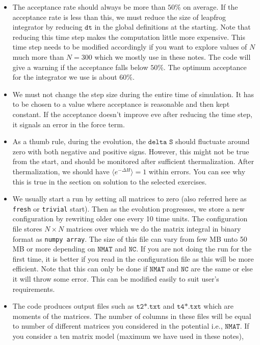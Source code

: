 \documentclass[11pt]{article}
\begin{document}
\begin{itemize} 
\item The acceptance rate should always be more than $50\%$
on average. If the acceptance rate is less than this, we
must reduce the size of leapfrog integrator by reducing 
$\texttt{dt}$ in the global definitions at the starting. Note that 
reducing this time step makes the computation little more expensive. 
This time step needs to be modified accordingly if you want to explore values of $N$
much more than $N = 300$ which we mostly use in these notes. The code will give a warning
if the acceptance falls below $50\%$. The optimum acceptance for the integrator we use is 
about $60\%$. 
\item We must not change the step size during the entire time of simulation. It has to be 
chosen to a value where acceptance is reasonable and then kept constant. If the acceptance
doesn't improve eve after reducing the time step, it signals an error in the force term.
\item As a thumb rule, during the evolution, the $\texttt{delta S}$ should fluctuate around zero
with both negative and positive signs. However, this might not be true from the start, and should
be monitored after sufficient thermalization. After thermalization, we should have 
$\langle e^{-\Delta H} \rangle = 1$ within errors. You can see why this is true in the section on 
solution to the selected exercises. 
\item We usually start a run by setting all matrices to zero (also referred here as \texttt{fresh} or \texttt{trivial} start). Then as the evolution progresses, we store a new configuration by rewriting older one
every 10 time units. The configuration file stores $N \times N$ matrices over which we do the matrix integral in binary format as \texttt{numpy array}. 
The size of this file can vary from few MB unto 50 MB or more depending on 
$\texttt{NMAT}$ and $\texttt{NC}$. If you are not doing the run for the first time, 
it is better if you read in the configuration file as this will be more efficient.  
Note that this can only be done if $\texttt{NMAT}$ and $\texttt{NC}$ are the same or else
it will throw some error. This can be modified easily to suit user's requirements. 
\item The code produces output files such as $\texttt{t2*.txt}$ and $\texttt{t4*.txt}$
which are moments of the matrices. The number of columns in these files will be equal to 
number of different matrices you considered in the potential i.e., $\texttt{NMAT}$. 
If you consider a ten matrix model (maximum we have used in these notes),

\end{itemize}
\end{document}
